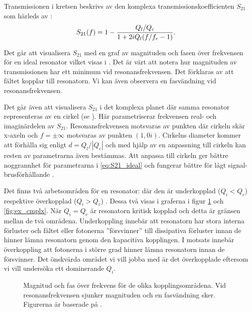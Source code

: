 \documentclass[main.tex]{subfiles}
\begin{document}
Transmissionen i kretsen beskrivs av den komplexa transmissionskoefficienten $S_{21}$ som härleds av \citeauthor{Boehme2016} \cite[s. 38]{Boehme2016}:
\begin{equation}
    S_{21}(f)=1-\frac{Q_l/Q_c}{1+2iQ_l\qty(f/f_r-1)}.
\label{eq:S21_ideal}
\end{equation}

Det går att visualisera $S_{21}$ med en graf av magnituden och fasen över frekvensen för en ideal resonator vilket visas i . Det är värt att notera hur magnituden av transmissionen har ett minimum vid resonansfrekvensen. Det förklaras av att fältet kopplar till resonatorn. Vi kan även observera en fasvändning vid resonansfrekvensen.

Det går även att visualisera $S_{21}$ i det komplexa planet där samma resonator representeras av en cirkel (se ). Här parametriserar frekvensen real- och imaginärdelen av $S_{21}$. Resonansfrekvensen motsvaras av punkten där cirkeln skär x-axeln och $f=\pm\infty$ motsvaras av punkten $(1,0i)$. Cirkelns diameter kommer att förhålla sig enligt $d=Q_l/|Q_c|$ och med hjälp av en anpassning till cirkeln kan resten av parametrarna även bestämmas. Att anpassa till cirkeln ger bättre noggrannhet för parametrarna i \ref{eq:S21_ideal} och fungerar bättre för lågt signal-brusförhållande \cite{Probst2015}.

Det finns två arbetsområden för en resonator: där den är underkopplad ($Q_i<Q_c$) respektive överkopplad ($Q_i>Q_c$) \cite{Boehme2016}. Dessa två visas i graferna i figur \ref{fig:ex_magphs} och \ref{fig:ex_cmplx}. När $Q_i=Q_c$ är resonatorn kritisk kopplad och detta är gränsen mellan de två områdena. Underkoppling innebär att resonatorn har stora interna förluster och fältet eller fotonerna ''försvinner'' till dissipativa förluster innan de hinner lämna resonatorn genom den kapacitiva kopplingen. I motsats innebär överkoppling att fotonerna i större grad hinner lämna resonatorn innan de försvinner. Det önskvärda området vi vill jobba med är det överkopplade eftersom vi vill undersöka ett dominerande $Q_i$.

\begin{figure}[H]
     \begin{subfigure}[b]{0.48\textwidth}
          \centering
          \setlength{}
          \setlength\figureheight{\figurewidth}
          
     \end{subfigure}
     \begin{subfigure}[b]{0.48\textwidth}
          \centering
          \setlength{}
          \setlength\figureheight{\figurewidth}
          
     \end{subfigure}
   \caption{Magnitud och fas över frekvens för de olika kopplingsområdena. Vid resonansfrekvensen sjunker magnituden och en fasvändning sker. Figurerna är baserade på \cite[fig. 2.4(a-c)]{Boehme2016}.}
    \label{fig:ex_magphs}
 \end{figure}
 
\end{document}
